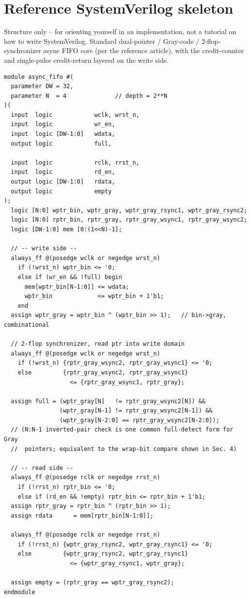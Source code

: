 \documentclass[12pt]{article}
\begin{document}
\clearpage
\section{Reference SystemVerilog skeleton}
Structure only -- for orienting yourself in an implementation, not a
tutorial on how to write SystemVerilog. Standard dual-pointer / Gray-code /
2-flop-synchronizer async FIFO core (per the reference article), with the
credit-counter and single-pulse credit-return layered on the write side.

\begin{lstlisting}[style=sv,caption={Async FIFO core: memory + Gray pointers + synchronizers}]
module async_fifo #(
  parameter DW = 32,
  parameter N  = 4              // depth = 2**N
)(
  input  logic            wclk, wrst_n,
  input  logic            wr_en,
  input  logic [DW-1:0]   wdata,
  output logic            full,

  input  logic            rclk, rrst_n,
  input  logic            rd_en,
  output logic [DW-1:0]   rdata,
  output logic            empty
);
  logic [N:0] wptr_bin, wptr_gray, wptr_gray_rsync1, wptr_gray_rsync2;
  logic [N:0] rptr_bin, rptr_gray, rptr_gray_wsync1, rptr_gray_wsync2;
  logic [DW-1:0] mem [0:(1<<N)-1];

  // -- write side --
  always_ff @(posedge wclk or negedge wrst_n)
    if (!wrst_n) wptr_bin <= '0;
    else if (wr_en && !full) begin
      mem[wptr_bin[N-1:0]] <= wdata;
      wptr_bin             <= wptr_bin + 1'b1;
    end
  assign wptr_gray = wptr_bin ^ (wptr_bin >> 1);   // bin->gray, combinational

  // 2-flop synchronizer, read ptr into write domain
  always_ff @(posedge wclk or negedge wrst_n)
    if (!wrst_n) {rptr_gray_wsync2, rptr_gray_wsync1} <= '0;
    else         {rptr_gray_wsync2, rptr_gray_wsync1}
                   <= {rptr_gray_wsync1, rptr_gray};

  assign full = (wptr_gray[N]   != rptr_gray_wsync2[N]) &&
                (wptr_gray[N-1] != rptr_gray_wsync2[N-1]) &&
                (wptr_gray[N-2:0] == rptr_gray_wsync2[N-2:0]);
  // (N:N-1 inverted-pair check is one common full-detect form for Gray
  //  pointers; equivalent to the wrap-bit compare shown in Sec. 4)

  // -- read side --
  always_ff @(posedge rclk or negedge rrst_n)
    if (!rrst_n) rptr_bin <= '0;
    else if (rd_en && !empty) rptr_bin <= rptr_bin + 1'b1;
  assign rptr_gray = rptr_bin ^ (rptr_bin >> 1);
  assign rdata      = mem[rptr_bin[N-1:0]];

  always_ff @(posedge rclk or negedge rrst_n)
    if (!rrst_n) {wptr_gray_rsync2, wptr_gray_rsync1} <= '0;
    else         {wptr_gray_rsync2, wptr_gray_rsync1}
                   <= {wptr_gray_rsync1, wptr_gray};

  assign empty = (rptr_gray == wptr_gray_rsync2);
endmodule
\end{lstlisting}
\end{document}
